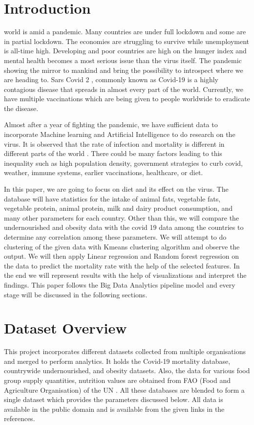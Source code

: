 \documentclass[journal,twoside,web]{ieeecolor}
\begin{document}
\section{Introduction}
\label{sec:introduction}
 world is amid a pandemic. Many countries are under full lockdown and some are in partial lockdown. The economies are struggling to survive while unemployment \cite{blustein2020unemployment} is all-time high. Developing and poor countries \cite{chin2020stability} are high on the hunger index and mental health becomes a most serious issue than the virus itself. The pandemic showing the mirror to mankind and bring the possibility to introspect where we are heading to. Sars Covid 2 \cite{chin2020stability}, commonly known as Covid-19 is a highly contagious disease that spreads in almost every part of the world. Currently, we have multiple vaccinations which are being given to people worldwide to eradicate the disease. 

Almost after a year of fighting the pandemic, we have sufficient data to incorporate Machine learning and Artificial Intelligence to do research on the virus. It is observed that the rate of infection and mortality is different in different parts of the world \cite{meo2020biological}. There could be many factors leading to this inequality such as high population density, government strategies to curb covid, weather, immune systems, earlier vaccinations, healthcare, or diet.

In this paper, we are going to focus on diet and its effect on the virus. The database \cite{noauthor_food_nodate} will have statistics for the intake of animal fats, vegetable fats, vegetable protein, animal protein, milk and dairy product consumption, and many other parameters for each country. Other than this, we will compare the undernourished and obesity data with the covid 19 data \cite{noauthor_covid-19_nodate} among the countries to determine any correlation among these parameters. We will attempt to do clustering of the given data with Kmeans clustering algorithm \cite{likas2003global} and observe the output. We will then apply Linear regression and Random forest regression on the data to predict the mortality rate with the help of the selected features. In the end we will represent results with the help of visualizations and interpret the findings. This paper follows the Big Data Analytics pipeline model and every stage will be discussed in the following sections.

\section{Dataset Overview}
This project incorporates different datasets collected from multiple organisations and merged to perform analytics. It holds the Covid-19 mortality database, countrywide undernourished, and obesity datasets. Also, the data for various food group supply quantities, nutrition values are obtained from FAO (Food and Agriculture Organisation) of the UN \cite{noauthor_food_nodate}. All these databases are blended to form a single dataset which provides the parameters discussed below. All data is available in the public domain and is available from the given links in the references.
\end{document}
